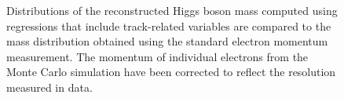 \documentclass{cmspaper}
\begin{document}
\begin{figure}[h]
\centering
	\caption{Distributions of the reconstructed Higgs boson mass computed using regressions 
          that include track-related variables are compared to the mass distribution obtained using
          the standard electron momentum measurement. The momentum of individual electrons from the 
          Monte Carlo simulation have been corrected to reflect the resolution measured in data. }
	\label{fig:HZZMass_Regression_WithCorrection}
\end{figure}
\end{document}
